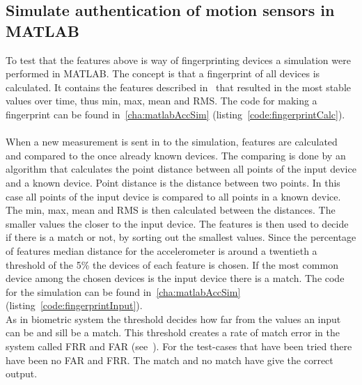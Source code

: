 \subsection{Simulate authentication of motion sensors in MATLAB}
To test that the features above is way of fingerprinting devices a simulation were performed in MATLAB. The concept is that a fingerprint of all devices is calculated. It contains the features described in~ that resulted in the most stable values over time, thus min, max, mean and RMS. The code for making a fingerprint can be found in~\ref{cha:matlabAccSim} (listing~\ref{code:fingerprintCalc}).\\
\\
When a new measurement is sent in to the simulation, features are calculated and compared to the once already known devices. The comparing is done by an algorithm that calculates the point distance between all points of the input device and a known device. Point distance is the distance between two points. In this case all points of the input device is compared to all points in a known device. \\
The min, max, mean and RMS is then calculated between the distances. The smaller values the closer to the input device. 
The features is then used to decide if there is a match or not, by sorting out the smallest values. Since the percentage of features median distance for the accelerometer is around a twentieth a threshold of the 5\% the devices of each feature is chosen. If the most common device among the chosen devices is the input device there is a match. The code for the simulation can be found in~\ref{cha:matlabAccSim} (listing~\ref{code:fingerprintInput}).\\
As in biometric system the threshold decides how far from the values an input can be and sill be a match. This threshold creates a rate of match error in the system called FRR and FAR (see~). For the test-cases that have been tried there have been no FAR and FRR. The match and no match have give the correct output.\\

